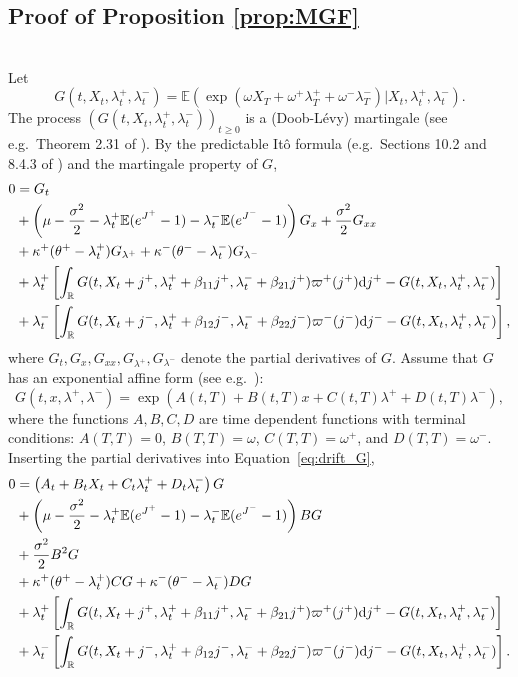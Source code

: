 \documentclass[11pt,a4paper]{article}
\numberwithin{equation}{section}
\theoremstyle{remark}
\theoremstyle{definition}
\newcommand{\E}{{\mathbb{E}}}
\newcommand{\dd}{{\rm d}}
\begin{document}
\subsection{Proof of Proposition \ref{prop:MGF}}
\label{proof:prop:MGF}
$\left.\right.$\\
Let
\[G(t,X_t,\lambda_t^+,\lambda_t^-)=\E\left(\exp(\omega X_T + \omega^+\lambda^+_T + \omega^-\lambda^-_T)\big|X_t, \lambda^+_t, \lambda^-_t\right).\]
The process $(G(t,X_t, \lambda_t^+, \lambda_t^-))_{t\geq 0}$ is a (Doob-L\'evy) martingale (see e.g.\ Theorem 2.31 of \cite{Klebaner2005}).
By the predictable It\^o formula (e.g.\ Sections 10.2 and 8.4.3 of \citep{jeanblanc2009mathematical}) and the martingale property of $G$,
\begin{align} \label{eq:drift_G}
    0 &=  G_t \nonumber\\
      &+ \left(\mu - \frac{\sigma^2}{2}-\lambda^+_t\E(e^{J^+}-1)-\lambda^-_t\E(e^{J^-}-1)\right)G_x %
      +\frac{\sigma^2}{2}G_{xx} \nonumber\\
      &+\kappa^+(\theta^+-\lambda^+_t)G_{\lambda^+} +\kappa^-(\theta^--\lambda^-_t)G_{\lambda^-} \nonumber\\
      &+\lambda^+_t\left[\int_\mathbb{R}G(t, X_t+j^+, \lambda_t^++\beta_{11}j^+, \lambda_t^-+\beta_{21}j^+) \varpi^+(j^+)\dd j^+ - G(t,X_t, \lambda_t^+, \lambda_t^-)\right]\nonumber\\
      &+\lambda^-_t\left[\int_\mathbb{R}G(t,X_t+j^-, \lambda_t^++\beta_{12}j^-, \lambda_t^-+\beta_{22}j^-) \varpi^-(j^-)\dd j^- - G(t,X_t, \lambda_t^+, \lambda_t^-)\right],
\end{align}
where $G_t, G_x, G_{xx}, G_{\lambda^+}, G_{\lambda^-}$ denote the partial derivatives of $G$.
Assume that $G$ has an exponential affine form (see e.g.\ \cite{Errais2010}):
\begin{equation*}
    G(t, x, \lambda^+, \lambda^-) = \exp\left(A(t,T)+ B(t,T)x +C(t,T)\lambda^+ +D(t,T)\lambda^-\right),
\end{equation*}
where the functions $A,B,C,D$ are time dependent functions with terminal conditions: $A(T,T)=0$, $B(T,T)=\omega$, $C(T,T)=\omega^+$, and $D(T,T)=\omega^-$.
Inserting the partial derivatives into Equation~\eqref{eq:drift_G},
\begin{align*}
    0 &= \left(A_t + B_t X_t + C_t \lambda_t^+ + D_t\lambda_t^-\right)G \\
      &+ \left(\mu - \frac{\sigma^2}{2}-\lambda^+_t\E(e^{J^+}-1)-\lambda^-_t\E(e^{J^-}-1)\right)BG\\
      &+\frac{\sigma^2}{2}B^2G \\
      &+\kappa^+(\theta^+-\lambda^+_t)CG +\kappa^-(\theta^--\lambda^-_t)DG \\
      &+\lambda^+_t\left[\int_\mathbb{R}G(t, X_t+j^+, \lambda_t^+ +\beta_{11}j^+, \lambda_t^- +\beta_{21}j^+) \varpi^+(j^+)\dd j^+ - G(t,X_t, \lambda_t^+, \lambda_t^-)\right]\\
      &+\lambda^-_t\left[\int_\mathbb{R}G(t, X_t+j^-, \lambda_t^+ +\beta_{12}j^-, \lambda_t^- +\beta_{22}j^-) \varpi^-(j^-)\dd j^- - G(t,X_t, \lambda_t^+, \lambda_t^-)\right].
\end{align*}
\end{document}
